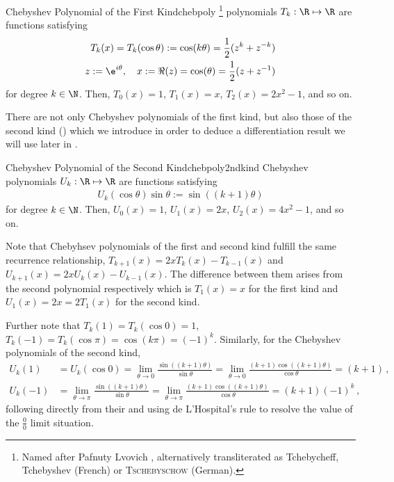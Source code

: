 \documentclass{prettytex/ox/mmsc-special-topic}
\begin{document}
  \begin{definition}{Chebyshev Polynomial of the First Kind}{chebpoly}
    \chebyshev\footnote{Named after Pafnuty Lvovich \textsc{\chebyshev}, alternatively transliterated as Tchebycheff, Tchebyshev (French) or \textsc{Tschebyschow} (German).} polynomials $T_k: \R \mapsto \R$ are functions satisfying
    \begin{align*}
      T_k(x) = T_k(\cos \theta) := \cos(k \theta) = \frac{1}{2} (z^k + z^{-k}) \\
      z := \e^{i \theta},\quad x := \Re(z) = \cos(\theta) = \frac{1}{2}(z + z^{-1})
    \end{align*}
    for degree $k \in \N$. Then, $T_0(x) = 1$, $T_1(x) = x$, $T_2(x) = 2x^2-1$, and so on.
  \end{definition}

  There are not only Chebyshev polynomials of the first kind, but also those of the second kind () which we introduce in order to deduce a differentiation result we will use later in .

  \begin{definition}{Chebyshev Polynomial of the Second Kind}{chebpoly2ndkind}
    Chebyshev polynomials $U_k: \R \mapsto \R$ are functions satisfying
    \begin{align*}
      U_k(\cos \theta) \sin \theta := \sin\left((k+1) \theta\right)
    \end{align*}
    for degree $k \in \N$. Then, $U_0(x) = 1$, $U_1(x) = 2x$, $U_2(x) = 4x^2-1$, and so on.
  \end{definition}
  Note that Chebyhsev polynomials of the first and second kind fulfill the same recurrence relationship, $T_{k+1}(x) = 2x T_k(x) - T_{k-1}(x)$ and $U_{k+1}(x) = 2x U_k(x) - U_{k-1}(x)$. The difference between them arises from the second polynomial respectively which is $T_1(x)=x$ for the first kind and $U_1(x) = 2x = 2 T_1(x)$ for the second kind.

  Further note that $T_k(1) = T_k(\cos 0) = 1$, $T_k(-1) = T_k(\cos \pi) = \cos(k \pi) = (-1)^k$.
  Similarly, for the Chebyshev polynomials of the second kind,
  \begin{align}
    \label{eq:cheb2ndkind-critical-value-1} U_k(1)   & = U_k(\cos 0) = \lim_{\theta \rightarrow 0} \frac{\sin\left((k+1) \theta\right)}{\sin \theta} = \lim_{\theta \rightarrow 0} \frac{(k+1)\cos\left((k+1) \theta\right)}{\cos \theta} = (k+1)\,, \\
    \label{eq:cheb2ndkind-critical-value--1} U_k(-1) & = \lim_{\theta \rightarrow \pi} \frac{\sin\left((k+1) \theta\right)}{\sin \theta} = \lim_{\theta \rightarrow \pi} \frac{(k+1)\cos\left((k+1) \theta\right)}{\cos \theta} = (k+1) (-1)^k\,,
  \end{align}
  following directly from their  and using de L'Hospital's rule to resolve the value of the $\frac{0}{0}$ limit situation.
\end{document}
